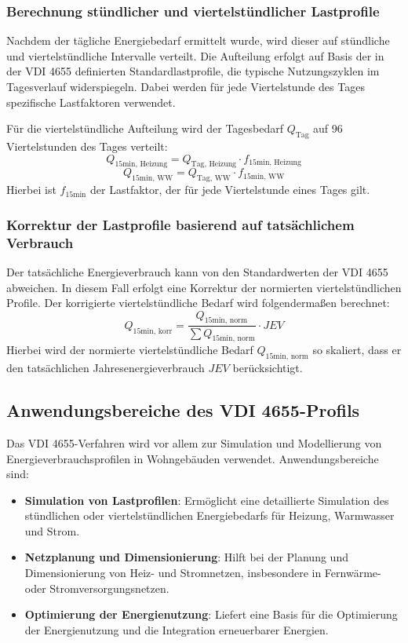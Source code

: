 \subsubsection{Berechnung stündlicher und viertelstündlicher Lastprofile}
Nachdem der tägliche Energiebedarf ermittelt wurde, wird dieser auf stündliche und viertelstündliche Intervalle verteilt. Die Aufteilung erfolgt auf Basis der in der VDI 4655 definierten Standardlastprofile, die typische Nutzungszyklen im Tagesverlauf widerspiegeln. Dabei werden für jede Viertelstunde des Tages spezifische Lastfaktoren verwendet.

Für die viertelstündliche Aufteilung wird der Tagesbedarf \( Q_{\text{Tag}} \) auf 96 Viertelstunden des Tages verteilt:
\[
Q_{\text{15min, Heizung}} = Q_{\text{Tag, Heizung}} \cdot f_{\text{15min, Heizung}}
\]
\[
Q_{\text{15min, WW}} = Q_{\text{Tag, WW}} \cdot f_{\text{15min, WW}}
\]
\noindent
Hierbei ist \( f_{\text{15min}} \) der Lastfaktor, der für jede Viertelstunde eines Tages gilt.

\subsubsection{Korrektur der Lastprofile basierend auf tatsächlichem Verbrauch}
Der tatsächliche Energieverbrauch kann von den Standardwerten der VDI 4655 abweichen. In diesem Fall erfolgt eine Korrektur der normierten viertelstündlichen Profile. Der korrigierte viertelstündliche Bedarf wird folgendermaßen berechnet:
\[
Q_{\text{15min, korr}} = \frac{Q_{\text{15min, norm}}}{\sum Q_{\text{15min, norm}}} \cdot JEV
\]
Hierbei wird der normierte viertelstündliche Bedarf \( Q_{\text{15min, norm}} \) so skaliert, dass er den tatsächlichen Jahresenergieverbrauch \( JEV \) berücksichtigt.

\subsection{Anwendungsbereiche des VDI 4655-Profils}
Das VDI 4655-Verfahren wird vor allem zur Simulation und Modellierung von Energieverbrauchsprofilen in Wohngebäuden verwendet. Anwendungsbereiche sind:

\begin{itemize}
    \item \textbf{Simulation von Lastprofilen}: Ermöglicht eine detaillierte Simulation des stündlichen oder viertelstündlichen Energiebedarfs für Heizung, Warmwasser und Strom.
    \item \textbf{Netzplanung und Dimensionierung}: Hilft bei der Planung und Dimensionierung von Heiz- und Stromnetzen, insbesondere in Fernwärme- oder Stromversorgungsnetzen.
    \item \textbf{Optimierung der Energienutzung}: Liefert eine Basis für die Optimierung der Energienutzung und die Integration erneuerbarer Energien.
\end{itemize}

